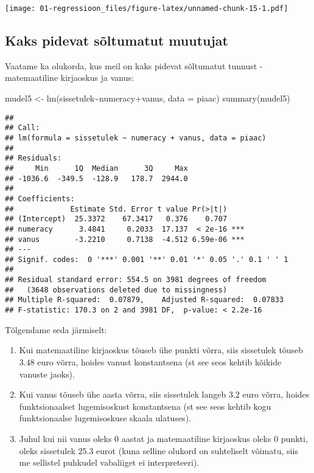 \documentclass[
]{book}
\newenvironment{Shaded}{\begin{snugshade}}{\end{snugshade}}
\newcommand{\AttributeTok}[1]{\textcolor[rgb]{0.77,0.63,0.00}{#1}}
\newcommand{\FunctionTok}[1]{\textcolor[rgb]{0.00,0.00,0.00}{#1}}
\newcommand{\NormalTok}[1]{#1}
\newcommand{\OtherTok}[1]{\textcolor[rgb]{0.56,0.35,0.01}{#1}}
\newcommand{\SpecialCharTok}[1]{\textcolor[rgb]{0.00,0.00,0.00}{#1}}
\providecommand{\tightlist}{%
  \setlength{\itemsep}{0pt}\setlength{\parskip}{0pt}}
\begin{document}
\texttt{[image: 01-regressioon\_files/figure-latex/unnamed-chunk-15-1.pdf]}

\hypertarget{kaks-pidevat-suxf5ltumatut-muutujat}{%
\subsection{Kaks pidevat sõltumatut muutujat}\label{kaks-pidevat-suxf5ltumatut-muutujat}}

Vaatame ka olukorda, kus meil on kaks pidevat sõltumatut tunnust - matemaatiline kirjaoskus ja vanus:

\begin{Shaded}
\begin{Highlighting}[]
\NormalTok{mudel5 }\OtherTok{\textless{}{-}} \FunctionTok{lm}\NormalTok{(sissetulek}\SpecialCharTok{\textasciitilde{}}\NormalTok{numeracy}\SpecialCharTok{+}\NormalTok{vanus, }\AttributeTok{data =}\NormalTok{ piaac)}
\FunctionTok{summary}\NormalTok{(mudel5)}
\end{Highlighting}
\end{Shaded}

\begin{verbatim}
## 
## Call:
## lm(formula = sissetulek ~ numeracy + vanus, data = piaac)
## 
## Residuals:
##     Min      1Q  Median      3Q     Max 
## -1036.6  -349.5  -128.9   178.7  2944.0 
## 
## Coefficients:
##             Estimate Std. Error t value Pr(>|t|)    
## (Intercept)  25.3372    67.3417   0.376    0.707    
## numeracy      3.4841     0.2033  17.137  < 2e-16 ***
## vanus        -3.2210     0.7138  -4.512 6.59e-06 ***
## ---
## Signif. codes:  0 '***' 0.001 '**' 0.01 '*' 0.05 '.' 0.1 ' ' 1
## 
## Residual standard error: 554.5 on 3981 degrees of freedom
##   (3648 observations deleted due to missingness)
## Multiple R-squared:  0.07879,    Adjusted R-squared:  0.07833 
## F-statistic: 170.3 on 2 and 3981 DF,  p-value: < 2.2e-16
\end{verbatim}

Tõlgendame seda järmiselt:

\begin{enumerate}
\def\labelenumi{\arabic{enumi}.}
\tightlist
\item
  Kui matemaatiline kirjaoskus tõuseb ühe punkti võrra, siis sissetulek tõuseb \(3.48\) euro võrra, hoides vanust konstantsena (st see seos kehtib kõikide vanuste jaoks).\\
\item
  Kui vanus tõuseb ühe aasta võrra, siis sissetulek langeb \(3.2\) euro võrra, hoides funktsionaalset lugemisoskust konstantsena (st see seos kehtib kogu funktsionaalse lugemisoskuse skaala ulatuses).\\
\item
  Juhul kui nii vanus oleks \(0\) aastat ja matemaatiline kirjaoskus oleks \(0\) punkti, oleks sissetulek \(25.3\) eurot (kuna selline olukord on suhteliselt võimatu, siis me sellistel puhkudel vabaliiget ei interpreteeri).
\end{enumerate}
\end{document}
